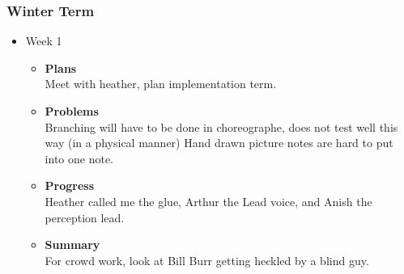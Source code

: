 	\subsubsection{Winter Term}
	\begin{itemize}
		\item{Week 1}
			\begin{itemize}
				\item \textbf{Plans} \\
				Meet with heather, plan implementation term.
				\item \textbf{Problems} \\
					Branching will have to be done in choreographe, does not test well this way (in a physical manner)
					Hand drawn picture notes are hard to put into one note.
				\item \textbf{Progress} \\
				Heather called me the glue, Arthur the Lead voice, and Anish the perception lead.
				\item \textbf{Summary} \\
				For crowd work, look at Bill Burr getting heckled by a blind guy.


\end{itemize}
\end{itemize}
